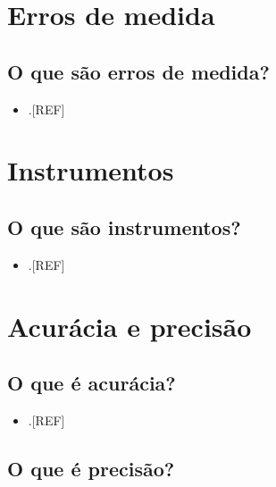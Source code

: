\documentclass[
  a4paper,
]{book}
\providecommand{\tightlist}{%
  \setlength{\itemsep}{0pt}\setlength{\parskip}{0pt}}
\begin{document}
\hypertarget{erro-medida}{%
\section{Erros de medida}\label{erro-medida}}

\hypertarget{o-que-suxe3o-erros-de-medida}{%
\subsection{O que são erros de medida?}\label{o-que-suxe3o-erros-de-medida}}

\begin{itemize}
\tightlist
\item
  .{[}REF{]}
\end{itemize}

\hypertarget{instrumentos}{%
\section{Instrumentos}\label{instrumentos}}

\hypertarget{o-que-suxe3o-instrumentos}{%
\subsection{O que são instrumentos?}\label{o-que-suxe3o-instrumentos}}

\begin{itemize}
\tightlist
\item
  .{[}REF{]}
\end{itemize}

\hypertarget{acuruxe1cia-e-precisuxe3o}{%
\section{Acurácia e precisão}\label{acuruxe1cia-e-precisuxe3o}}

\hypertarget{o-que-uxe9-acuruxe1cia}{%
\subsection{O que é acurácia?}\label{o-que-uxe9-acuruxe1cia}}

\begin{itemize}
\tightlist
\item
  .{[}REF{]}
\end{itemize}

\hypertarget{o-que-uxe9-precisuxe3o}{%
\subsection{O que é precisão?}\label{o-que-uxe9-precisuxe3o}}
\end{document}
